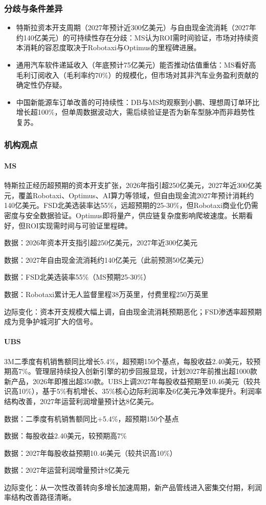 \documentclass[11pt]{ctexart}
\begin{document}
\subsubsection*{分歧与条件差异}
\begin{itemize}
  \item 特斯拉资本开支周期（2027年预计近300亿美元）与自由现金流消耗（2027年约140亿美元）的可持续性存在分歧：MS认为ROI需时间验证，市场对持续资本消耗的容忍度取决于Robotaxi与Optimus的里程碑进展。
  \item 通用汽车软件递延收入（年底预计75亿美元）能否推动估值重估：MS看好高毛利订阅收入（毛利率约70\%）的规模化，但市场对其非汽车业务盈利贡献的确定性仍存疑。
  \item 中国新能源车订单改善的可持续性：DB与MS均观察到小鹏、理想周订单环比增长超100\%，但单周数据波动大，需后续验证是否为新车型脉冲而非趋势性复苏。
\end{itemize}
\subsubsection*{机构观点}
\paragraph{MS} 特斯拉正经历超预期的资本开支扩张，2026年指引超250亿美元，2027年近300亿美元，覆盖Robotaxi、Optimus、AI算力等领域，但自由现金流2027年预计消耗约140亿美元。FSD北美选装率达55\%，远超预期的25-30\%，但Robotaxi商业化仍需密度与安全数据验证。Optimus即将量产，供应链复杂度影响爬坡速度。长期看好，但ROI实现需时间与可验证里程碑。
{\small\color{refgray}数据：2026年资本开支指引超250亿美元，2027年近300亿美元\par}
{\small\color{refgray}数据：2027年自由现金流消耗约140亿美元（此前预测50亿美元）\par}
{\small\color{refgray}数据：FSD北美选装率55\%（MS预期25-30\%）\par}
{\small\color{refgray}数据：Robotaxi累计无人监督里程38万英里，付费里程250万英里\par}
{\small\color{refgray}边际变化：资本开支规模大幅上调，自由现金流消耗预期恶化；FSD渗透率超预期成为竞争护城河扩大的信号。\par}
\paragraph{UBS} 3M二季度有机销售额同比增长5.4\%，超预期150个基点，每股收益2.40美元，较预期高7\%。管理层持续投入创新引擎的初步回报显现，计划2027年前推出超1000款新产品，2026年即推出超350款。UBS上调2027年每股收益预期至10.46美元（较共识高10\%），基于5\%有机增长、35\%核心边际利润率及6亿美元净效率提升。利润率结构改善，2027年运营利润增量预计达8亿美元。
{\small\color{refgray}数据：二季度有机销售额同比+5.4\%，超预期150个基点\par}
{\small\color{refgray}数据：每股收益2.40美元，较预期高7\%\par}
{\small\color{refgray}数据：2027年每股收益预期10.46美元（较共识高10\%）\par}
{\small\color{refgray}数据：2027年运营利润增量预计8亿美元\par}
{\small\color{refgray}边际变化：从一次性改善转向多增长加速周期，新产品管线进入密集交付期，利润率结构改善路径清晰。\par}
\end{document}
